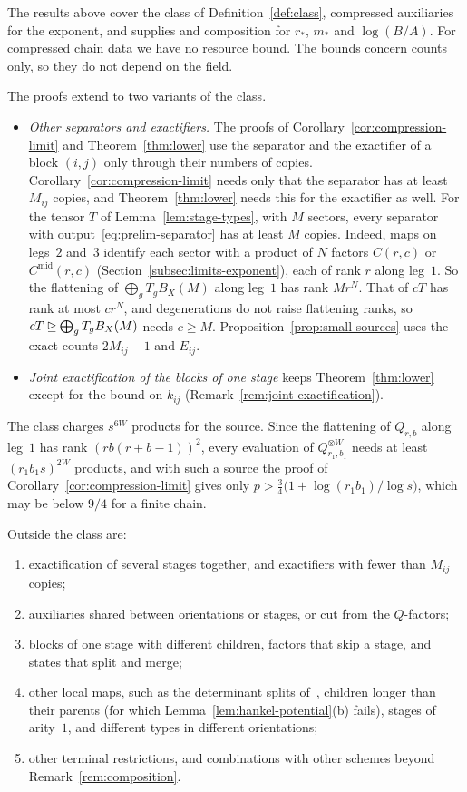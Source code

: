 The results above cover the class of Definition~\ref{def:class},
compressed auxiliaries for the exponent, and supplies and composition
for \(r_*\), \(m_*\) and \(\log(B/A)\). For compressed chain data we
have no resource bound. The bounds concern counts only, so they do not
depend on the field.

The proofs extend to two variants of the class.
\begin{itemize}
\item \emph{Other separators and exactifiers.} The proofs of
Corollary~\ref{cor:compression-limit} and Theorem~\ref{thm:lower} use
the separator and the exactifier of a block \((i,j)\) only through their
numbers of copies. Corollary~\ref{cor:compression-limit} needs only that
the separator has at least \(M_{ij}\) copies, and
Theorem~\ref{thm:lower} needs this for the exactifier as well. For
the tensor \(T\) of Lemma~\ref{lem:stage-types}, with \(M\) sectors,
every separator with output~\eqref{eq:prelim-separator} has at least
\(M\) copies. Indeed, maps on legs~\(2\) and~\(3\) identify each sector
with a product of \(N\) factors \(C(r,c)\) or \(C^{\mathrm{mid}}(r,c)\)
(Section~\ref{subsec:limits-exponent}), each of rank \(r\) along
leg~\(1\). So the flattening of \(\bigoplus_gT_gB_X(M)\) along leg~\(1\)
has rank \(Mr^N\). That of \(cT\) has rank at most \(cr^N\), and
degenerations do not raise flattening ranks, so
\(cT\unrhd\bigoplus_gT_gB_X(M)\) needs \(c\ge M\).
Proposition~\ref{prop:small-sources} uses the exact counts
\(2M_{ij}-1\) and \(E_{ij}\).
\item \emph{Joint exactification of the blocks of one stage} keeps
Theorem~\ref{thm:lower} except for the bound on \(k_{ij}\)
(Remark~\ref{rem:joint-exactification}).
\end{itemize}

The class charges \(s^{6W}\) products for the source. Since the
flattening of \(Q_{r,b}\) along leg~\(1\) has rank \((rb(r+b-1))^2\),
every evaluation of \(Q_{r_1,b_1}^{\otimes W}\) needs at least
\((r_1b_1s)^{2W}\) products, and with such a source the proof of
Corollary~\ref{cor:compression-limit} gives only
\(p>\frac34\bigl(1+\log(r_1b_1)/\log s\bigr)\), which may be below
\(9/4\) for a finite chain.

Outside the class are:
\begin{enumerate}
\item[(i)] exactification of several stages together, and exactifiers
with fewer than \(M_{ij}\) copies;
\item[(ii)] auxiliaries shared between orientations or stages, or cut
from the \(Q\)-factors;
\item[(iii)] blocks of one stage with different children, factors that
skip a stage, and states that split and merge;
\item[(iv)] other local maps, such as the determinant splits
of~\citep[Section~4]{FinCon26}, children longer than their parents (for
which Lemma~\ref{lem:hankel-potential}(b) fails), stages of arity~\(1\),
and different types in different orientations;
\item[(v)] other terminal restrictions, and combinations with other
schemes beyond Remark~\ref{rem:composition}.
\end{enumerate}
